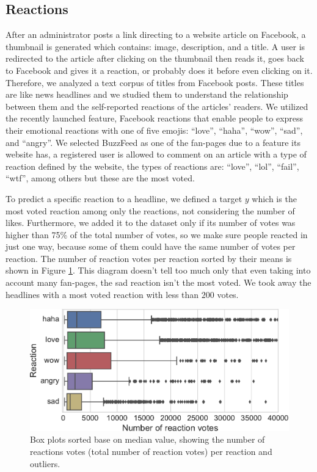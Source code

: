 \documentclass[11pt]{article}
\begin{document}
\subsection{Reactions}

After an administrator posts a link directing to a website article on Facebook, a thumbnail is generated which contains: image, description, and a title. A user is redirected to the article after clicking on the thumbnail then reads it, goes back to Facebook and gives it a reaction, or probably does it before even clicking on it. Therefore, we analyzed a text corpus of titles from Facebook posts. These titles are like news headlines and we studied them to understand the relationship between them and the self-reported reactions of the articles' readers. We utilized the recently launched feature, Facebook reactions that enable people to express their emotional reactions with one of five emojis: ``love'', ``haha'', ``wow'', ``sad'', and ``angry''. We selected BuzzFeed as one of the fan-pages due to a feature its website has, a registered user is allowed to comment on an article with a type of reaction defined by the website, the types of reactions are: ``love'', ``lol'', ``fail'', ``wtf'', among others but these are the most voted.

To predict a specific reaction to a headline, we defined a target $y$ which is the most voted reaction among only the reactions, not considering the number of likes. Furthermore, we added it to the dataset only if its number of votes was higher than 75\% of the total number of votes, so we make sure people reacted in just one way, because some of them could have the same number of votes per reaction. The number of reaction votes per reaction sorted by their means is shown in Figure \ref{fig:boxplot}. This diagram doesn't tell too much only that even taking into account many fan-pages, the sad reaction isn't the most voted. We took away the headlines with a most voted reaction with less than $200$ votes.

\begin{figure}[ht!]
\centering
\includegraphics[width=1.0\columnwidth]{../3_notebooks/notebook_figures/boxplots_fblike_reactions.pdf}
\caption{Box plots sorted base on median value, showing the number of reactions votes (total number of reaction votes) per reaction and outliers. }
\label{fig:boxplot}
\end{figure}
\end{document}
